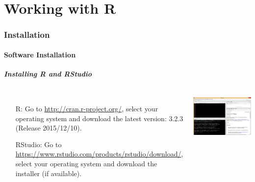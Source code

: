 \part{Working with R}


\section{Installation}
\subsection{Software Installation}

\begin{frame}
  \frametitle{Installing R and RStudio}
    \begin{columns}
        \begin{enumerate}
           \item[R:] Go to \small \url{http://cran.r-project.org/}, select your operating system and download the latest version: 3.2.3 (Release 2015/12/10).
           \item[RStudio:] Go to \small \url{https://www.rstudio.com/products/rstudio/download/}, select your operating system and download the installer (if available).
        \end{enumerate}
%
       \begin{center}
         \includegraphics[width=1\textwidth]{images/Rwindow.png}
        \end{center}
      \end{columns}
\end{frame}


